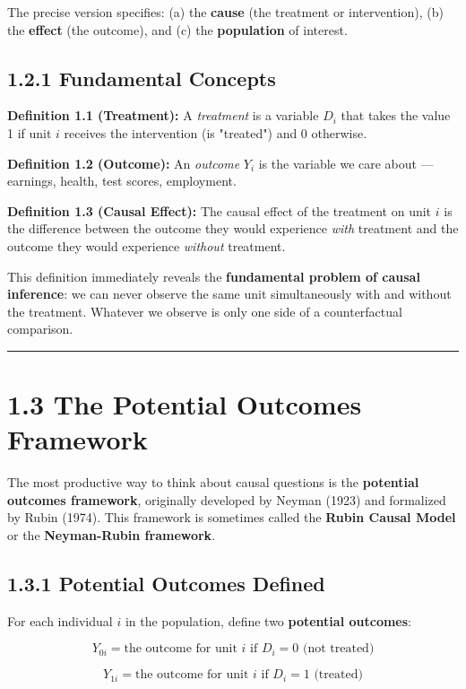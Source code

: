 The precise version specifies: (a) the \textbf{cause} (the treatment or intervention), (b) the \textbf{effect} (the outcome), and (c) the \textbf{population} of interest.

\subsection{1.2.1 Fundamental Concepts}

\textbf{Definition 1.1 (Treatment):} A \textit{treatment} is a variable $D_i$ that takes the value 1 if unit $i$ receives the intervention (is "treated") and 0 otherwise.

\textbf{Definition 1.2 (Outcome):} An \textit{outcome} $Y_i$ is the variable we care about --- earnings, health, test scores, employment.

\textbf{Definition 1.3 (Causal Effect):} The causal effect of the treatment on unit $i$ is the difference between the outcome they would experience \textit{with} treatment and the outcome they would experience \textit{without} treatment.

This definition immediately reveals the \textbf{fundamental problem of causal inference}: we can never observe the same unit simultaneously with and without the treatment. Whatever we observe is only one side of a counterfactual comparison.

\medskip\hrule\medskip

\section{1.3 The Potential Outcomes Framework}

The most productive way to think about causal questions is the \textbf{potential outcomes framework}, originally developed by Neyman (1923) and formalized by Rubin (1974). This framework is sometimes called the \textbf{Rubin Causal Model} or the \textbf{Neyman-Rubin framework}.

\subsection{1.3.1 Potential Outcomes Defined}

For each individual $i$ in the population, define two \textbf{potential outcomes}:

\[
Y_{0i} = \text{the outcome for unit } i \text{ if } D_i = 0 \text{ (not treated)}
\]

\[
Y_{1i} = \text{the outcome for unit } i \text{ if } D_i = 1 \text{ (treated)}
\]

